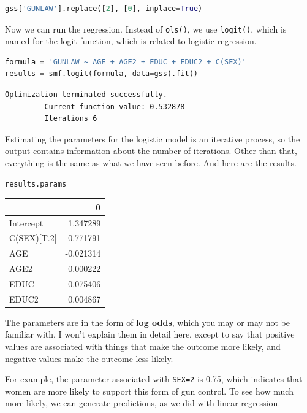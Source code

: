 \begin{lstlisting}[language=Python,style=source]
gss['GUNLAW'].replace([2], [0], inplace=True)
\end{lstlisting}

Now we can run the regression. Instead of
\passthrough{\lstinline!ols()!}, we use
\passthrough{\lstinline!logit()!}, which is named for the logit
function, which is related to logistic regression.

\begin{lstlisting}[language=Python,style=source]
formula = 'GUNLAW ~ AGE + AGE2 + EDUC + EDUC2 + C(SEX)'
results = smf.logit(formula, data=gss).fit()
\end{lstlisting}

\begin{lstlisting}[style=output]
Optimization terminated successfully.
         Current function value: 0.532878
         Iterations 6
\end{lstlisting}

Estimating the parameters for the logistic model is an iterative
process, so the output contains information about the number of
iterations. Other than that, everything is the same as what we have seen
before. And here are the results.

\begin{lstlisting}[language=Python,style=source]
results.params
\end{lstlisting}

\begin{tabular}{lr}
\toprule
{} &         0 \\
\midrule
Intercept   &  1.347289 \\
C(SEX)[T.2] &  0.771791 \\
AGE         & -0.021314 \\
AGE2        &  0.000222 \\
EDUC        & -0.075406 \\
EDUC2       &  0.004867 \\
\bottomrule
\end{tabular}

The parameters are in the form of \textbf{log odds}, which you may or
may not be familiar with. I won't explain them in detail here, except to
say that positive values are associated with things that make the
outcome more likely, and negative values make the outcome less likely.

For example, the parameter associated with
\passthrough{\lstinline!SEX=2!} is 0.75, which indicates that women are
more likely to support this form of gun control. To see how much more
likely, we can generate predictions, as we did with linear regression.

